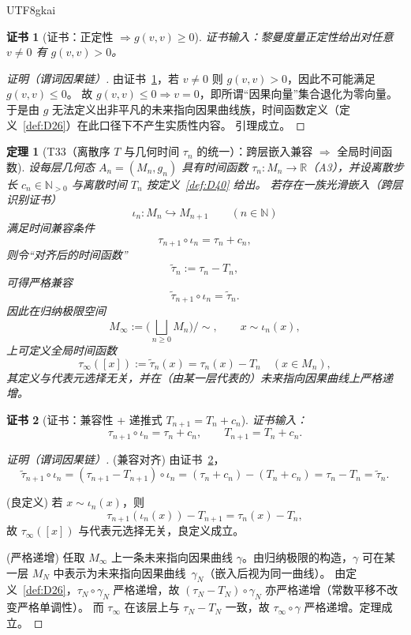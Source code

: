 \documentclass[12pt]{article}
\newtheorem{theorem}{定理}[section]
\newtheorem{Certificate}{证书}[section]
\begin{document}
\begin{CJK*}{UTF8}{gkai}
\begin{Certificate}[证书：正定性 $\Rightarrow g(v,v)\ge 0$]
\label{cert:L9}
证书输入：黎曼度量正定性给出对任意 $v\neq 0$ 有 $g(v,v)>0$。
\end{Certificate}

\begin{proof}[证明（谓词因果链）]
由证书~\ref{cert:L9}，若 $v\neq 0$ 则 $g(v,v)>0$，因此不可能满足 $g(v,v)\le 0$。
故 $g(v,v)\le 0\Rightarrow v=0$，即所谓“因果向量”集合退化为零向量。
于是由 $g$ 无法定义出非平凡的未来指向因果曲线族，时间函数定义（定义~\ref{def:D26}）在此口径下不产生实质性内容。
引理成立。
\end{proof}

\begin{theorem}[T33（离散序 $T$ 与几何时间 $\tau_n$ 的统一）：跨层嵌入兼容 $\Rightarrow$ 全局时间函数]
\label{thm:T33}
设每层几何态 $A_n=(M_n,g_n)$ 具有时间函数 $\tau_n:M_n\to\mathbb R$（A3），并设离散步长 $c_n\in\mathbb N_{>0}$ 与离散时间 $T_n$ 按定义~\ref{def:D40}
  给出。
若存在一族光滑嵌入（跨层识别证书）
\[
\iota_n:M_n\hookrightarrow M_{n+1}\qquad (n\in\mathbb N)
\]
满足时间兼容条件
\[
\tau_{n+1}\circ \iota_n=\tau_n+c_n,
\]
则令“对齐后的时间函数”
\[
\widetilde\tau_n:=\tau_n-T_n,
\]
可得严格兼容
\[
\widetilde\tau_{n+1}\circ \iota_n=\widetilde\tau_n.
\]
因此在归纳极限空间
\[
M_\infty:=\Big(\bigsqcup_{n\ge 0} M_n\Big)\Big/\sim,\qquad x\sim \iota_n(x),
\]
上可定义全局时间函数
\[
\tau_\infty([x]):=\widetilde\tau_n(x)=\tau_n(x)-T_n\quad(x\in M_n),
\]
其定义与代表元选择无关，并在（由某一层代表的）未来指向因果曲线上严格递增。
\end{theorem}

\begin{Certificate}[证书：兼容性 + 递推式 $T_{n+1}=T_n+c_n$]
\label{cert:T33}
证书输入：
\[
\tau_{n+1}\circ \iota_n=\tau_n+c_n,
\qquad
T_{n+1}=T_n+c_n.
\]
\end{Certificate}

\begin{proof}[证明（谓词因果链）]
(兼容对齐) 由证书~\ref{cert:T33}，
\[
\widetilde\tau_{n+1}\circ \iota_n
=(\tau_{n+1}-T_{n+1})\circ \iota_n
=(\tau_n+c_n)-(T_n+c_n)
=\tau_n-T_n
=\widetilde\tau_n.
\]

(良定义) 若 $x\sim \iota_n(x)$，则
\[
\tau_{n+1}(\iota_n(x))-T_{n+1}
=\tau_n(x)-T_n,
\]
故 $\tau_\infty([x])$ 与代表元选择无关，良定义成立。

(严格递增) 任取 $M_\infty$ 上一条未来指向因果曲线 $\gamma$。由归纳极限的构造，$\gamma$ 可在某一层 $M_N$ 中表示为未来指向因果曲线 $\,\gamma_N$（嵌入后视为同一曲线）。
由定义~\ref{def:D26}，$\tau_N\circ\gamma_N$ 严格递增，故 $(\tau_N-T_N)\circ\gamma_N$ 亦严格递增（常数平移不改变严格单调性）。
而 $\tau_\infty$ 在该层上与 $\tau_N-T_N$ 一致，故 $\tau_\infty\circ\gamma$ 严格递增。定理成立。
\end{proof}


\end{CJK*}
\end{document}
